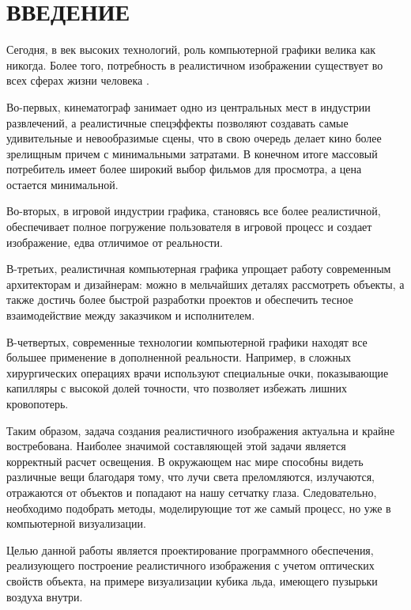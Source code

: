 \chapter*{ВВЕДЕНИЕ}

Сегодня, в век высоких технологий, роль компьютерной графики велика как никогда. Более того, потребность в реалистичном изображении существует во всех сферах жизни человека \cite{graphics_usage}. 

Во-первых, кинематограф занимает одно из центральных мест в индустрии развлечений, а реалистичные спецэффекты позволяют создавать самые удивительные и невообразимые сцены, что в свою очередь делает кино более зрелищным причем с минимальными затратами. В конечном итоге массовый потребитель имеет более широкий выбор фильмов для просмотра, а цена остается минимальной. 

Во-вторых, в игровой индустрии графика, становясь все более реалистичной, обеспечивает полное погружение пользователя в игровой процесс и создает изображение, едва отличимое от реальности. 

В-третьих, реалистичная компьютерная графика упрощает работу современным архитекторам и дизайнерам: можно в мельчайших деталях рассмотреть объекты, а также достичь более быстрой разработки проектов и обеспечить тесное взаимодействие между заказчиком и исполнителем. 

В-четвертых, современные технологии компьютерной графики находят все большее применение в дополненной реальности. Например, в сложных хирургических операциях врачи используют специальные очки, показывающие капилляры с высокой долей точности, что позволяет избежать лишних кровопотерь.

Таким образом, задача создания реалистичного изображения актуальна и крайне востребована. Наиболее значимой составляющей этой задачи является корректный расчет освещения. В окружающем нас мире способны видеть различные вещи благодаря тому, что лучи света преломляются, излучаются, отражаются от объектов и попадают на нашу сетчатку глаза. Следовательно, необходимо подобрать методы, моделирующие тот же самый процесс, но уже в компьютерной визуализации.

Целью данной работы является проектирование программного обеспечения, реализующего построение реалистичного изображения с учетом оптических свойств объекта, на примере визуализации кубика льда, имеющего пузырьки воздуха внутри. 

\newpage

